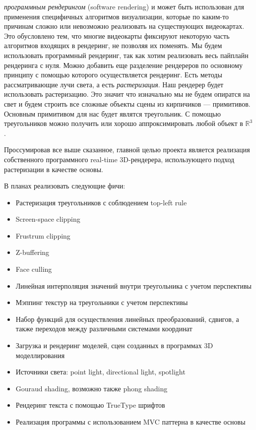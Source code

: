 \documentclass{article}
\begin{document}
\emph{программным рендерингом} (software rendering) и может быть 
использован для применения специфичных алгоритмов визуализации, которые 
по каким-то причинам сложно или невозможно реализовать на существующих видеокартах.
Это обусловлено тем, что многие видеокарты фиксируют некоторую 
часть алгоритмов входящих в рендеринг, не позволяя их поменять.
Мы будем использовать программный рендеринг, так как хотим 
реализовать весь пайплайн рендеринга с нуля. Можно добавить еще 
разделение рендереров по основному принципу с помощью которого осуществляется рендеринг. 
Есть методы рассматривающие 
лучи света, а есть \emph{растеризация}. Наш рендерер будет использовать растеризацию. 
Это значит что изначально мы не будем опиратся на свет и будем 
строить все сложные объекты сцены из кирпичиков --- примитивов. 
Основным примитивом для нас будет являтся треугольник. С помощью 
треугольников можно получить или хорошо аппроксимировать любой 
объект в $\mathbb{R}^3$.

Проссумировав все выше сказанное, главной целью проекта является реализация собственного программного real-time 
3D-рендерера, использующего подход растеризации в качестве основы.

В планах реализовать следующие фичи:
\begin{itemize}
    \item Растеризация треугольников с соблюдением top-left rule 
    \item Screen-space clipping
    \item Frustrum clipping
    \item Z-buffering
    \item Face culling
    \item Линейная интерполяция значений внутри треугольника с учетом перспективы
    \item Мэппинг текстур на треугольники с учетом перспективы
    \item Набор функций для осуществления линейных преобразований, сдвигов, а также 
    переходов между различными системами координат 
    \item Загрузка и рендеринг моделей, сцен созданных в программах 3D моделлирования 
    \item Источники света: point light, directional light, spotlight 
    \item Gouraud shading, возможно также phong shading
    \item Рендеринг текста с помощью TrueType шрифтов
    \item Реализация программы с использованием MVC паттерна в качестве основы
\end{itemize}
\end{document}
